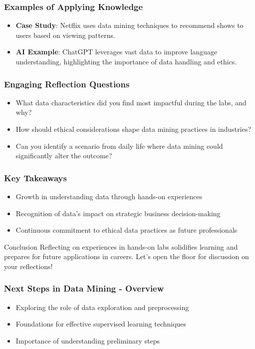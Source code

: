 \documentclass[aspectratio=169]{beamer}
\begin{document}
\begin{frame}[fragile]
    \frametitle{Examples of Applying Knowledge}
    \begin{itemize}
        \item \textbf{Case Study}: Netflix uses data mining techniques to recommend shows to users based on viewing patterns.
        \item \textbf{AI Example}: ChatGPT leverages vast data to improve language understanding, highlighting the importance of data handling and ethics.
    \end{itemize}
\end{frame}

\begin{frame}[fragile]
    \frametitle{Engaging Reflection Questions}
    \begin{itemize}
        \item What data characteristics did you find most impactful during the labs, and why?
        \item How should ethical considerations shape data mining practices in industries?
        \item Can you identify a scenario from daily life where data mining could significantly alter the outcome?
    \end{itemize}
\end{frame}

\begin{frame}[fragile]
    \frametitle{Key Takeaways}
    \begin{itemize}
        \item Growth in understanding data through hands-on experiences
        \item Recognition of data's impact on strategic business decision-making
        \item Continuous commitment to ethical data practices as future professionals
    \end{itemize}
    \begin{block}{Conclusion}
        Reflecting on experiences in hands-on labs solidifies learning and prepares for future applications in careers. Let's open the floor for discussion on your reflections!
    \end{block}
\end{frame}

\begin{frame}[fragile]
    \frametitle{Next Steps in Data Mining - Overview}
    \begin{itemize}
        \item Exploring the role of data exploration and preprocessing
        \item Foundations for effective supervised learning techniques
        \item Importance of understanding preliminary steps
    \end{itemize}
\end{frame}
\end{document}
